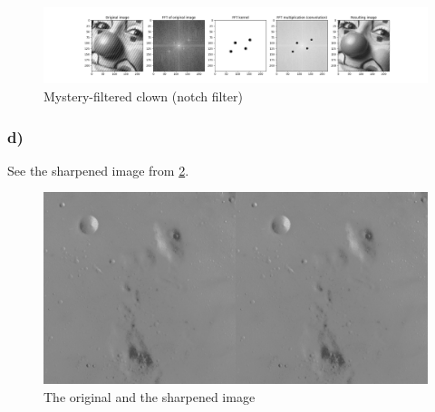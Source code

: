 \begin{figure}[]
    \centering
    \includegraphics[width=1.00\textwidth]{figures/image_processed/clown_filtered_subplots.png}
    \caption{Mystery-filtered clown (notch filter)}
    \label{fig:clown_filtered}
\end{figure}

\subsubsection*{d)}
See the sharpened image from \cref{fig:moon_sharpened}.

\begin{figure}[]
    \centering
    \includegraphics[width=1.00\textwidth]{figures/image_processed/moon_sharpened.png}
    \caption{The original and the sharpened image}
    \label{fig:moon_sharpened}
\end{figure}